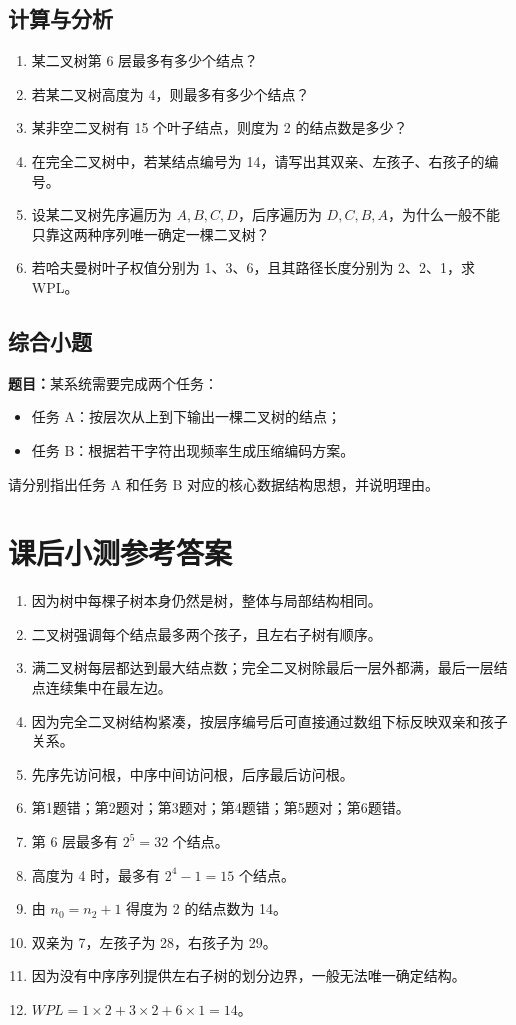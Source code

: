 \documentclass{../../note}
\begin{document}
\subsection{计算与分析}

\begin{enumerate}
  \item 某二叉树第 6 层最多有多少个结点？
  \item 若某二叉树高度为 4，则最多有多少个结点？
  \item 某非空二叉树有 15 个叶子结点，则度为 2 的结点数是多少？
  \item 在完全二叉树中，若某结点编号为 14，请写出其双亲、左孩子、右孩子的编号。
  \item 设某二叉树先序遍历为 $A,B,C,D$，后序遍历为 $D,C,B,A$，为什么一般不能只靠这两种序列唯一确定一棵二叉树？
  \item 若哈夫曼树叶子权值分别为 1、3、6，且其路径长度分别为 2、2、1，求 WPL。
\end{enumerate}

\subsection{综合小题}

\textbf{题目：}某系统需要完成两个任务：

\begin{itemize}
  \item 任务 A：按层次从上到下输出一棵二叉树的结点；
  \item 任务 B：根据若干字符出现频率生成压缩编码方案。
\end{itemize}

请分别指出任务 A 和任务 B 对应的核心数据结构思想，并说明理由。

\section{课后小测参考答案}

\begin{enumerate}
  \item 因为树中每棵子树本身仍然是树，整体与局部结构相同。
  \item 二叉树强调每个结点最多两个孩子，且左右子树有顺序。
  \item 满二叉树每层都达到最大结点数；完全二叉树除最后一层外都满，最后一层结点连续集中在最左边。
  \item 因为完全二叉树结构紧凑，按层序编号后可直接通过数组下标反映双亲和孩子关系。
  \item 先序先访问根，中序中间访问根，后序最后访问根。
  \item 第1题错；第2题对；第3题对；第4题错；第5题对；第6题错。
  \item 第 6 层最多有 $2^5 = 32$ 个结点。
  \item 高度为 4 时，最多有 $2^4 - 1 = 15$ 个结点。
  \item 由 $n_0 = n_2 + 1$ 得度为 2 的结点数为 14。
  \item 双亲为 7，左孩子为 28，右孩子为 29。
  \item 因为没有中序序列提供左右子树的划分边界，一般无法唯一确定结构。
  \item $WPL = 1 \times 2 + 3 \times 2 + 6 \times 1 = 14$。
\end{enumerate}
\end{document}
